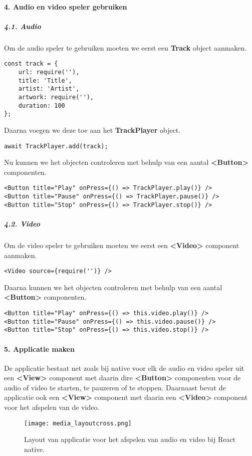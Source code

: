\paragraph{4. Audio en video speler gebruiken}
\subparagraph{4.1. Audio}
Om de audio speler te gebruiken moeten we eerst een \textbf{Track} object aanmaken.
\begin{verbatim}
const track = {
    url: require(''),
    title: 'Title',
    artist: 'Artist',
    artwork: require(''),
    duration: 100
};
\end{verbatim}
Daarna voegen we deze toe aan het \textbf{TrackPlayer} object.
\begin{verbatim}
await TrackPlayer.add(track);
\end{verbatim}
Nu kunnen we het objecten controleren met behulp van een aantal \textbf{<Button>} componenten.
\begin{verbatim}
<Button title="Play" onPress={() => TrackPlayer.play()} />
<Button title="Pause" onPress={() => TrackPlayer.pause()} />
<Button title="Stop" onPress={() => TrackPlayer.stop()} />
\end{verbatim}

\subparagraph{4.2. Video}
Om de video speler te gebruiken moeten we eerst een \textbf{<Video>} component aanmaken.
\begin{verbatim}
<Video source={require('')} />
\end{verbatim}
Daarna kunnen we het objecten controleren met behulp van een aantal \textbf{<Button>} componenten.
\begin{verbatim}
<Button title="Play" onPress={() => this.video.play()} />
<Button title="Pause" onPress={() => this.video.pause()} />
<Button title="Stop" onPress={() => this.video.stop()} />
\end{verbatim}

\paragraph{5. Applicatie maken}
De applicatie bestaat net zoals bij native voor elk de audio en video speler uit een \textbf{<View>}
component met daarin dire \textbf{<Button>} componenten voor de audio of video te starten, te pauzeren
of te stoppen. Daarnaast bevat de applicatie ook een \textbf{<View>} component met daarin een
\textbf{<Video>} component voor het afspelen van de video.
\begin{figure}[H]
    \centering
    \texttt{[image: media\_layoutcross.png]}
    \caption{Layout van applicatie voor het afspelen van audio en video bij React native.}
\end{figure}


